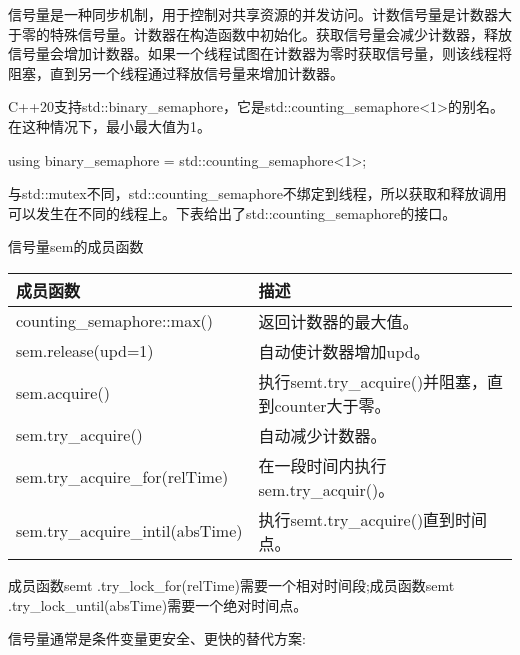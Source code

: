 信号量是一种同步机制，用于控制对共享资源的并发访问。计数信号量是计数器大于零的特殊信号量。计数器在构造函数中初始化。获取信号量会减少计数器，释放信号量会增加计数器。如果一个线程试图在计数器为零时获取信号量，则该线程将阻塞，直到另一个线程通过释放信号量来增加计数器。

C++20支持std::binary\_semaphore，它是std::counting\_semaphore<1>的别名。在这种情况下，最小最大值为1。

\begin{cpp}
using binary_semaphore = std::counting_semaphore<1>;
\end{cpp}

与std::mutex不同，std::counting\_semaphore不绑定到线程，所以获取和释放调用可以发生在不同的线程上。下表给出了std::counting\_semaphore的接口。

\begin{center}
信号量sem的成员函数
\end{center}

\begin{longtable}[c]{|l|l|}
\hline
\textbf{成员函数}         & \textbf{描述}                             \\ \hline
\endfirsthead
%
\endhead
%
counting\_semaphore::max()       & 返回计数器的最大值。         \\ \hline
sem.release(upd=1)               & 自动使计数器增加upd。             \\ \hline
sem.acquire() & 执行semt.try\_acquire()并阻塞，直到counter大于零。 \\ \hline
sem.try\_acquire()               & 自动减少计数器。               \\ \hline
sem.try\_acquire\_for(relTime)   & 在一段时间内执行sem.try\_acquir()。 \\ \hline
sem.try\_acquire\_intil(absTime) & 执行semt.try\_acquire()直到时间点。  \\ \hline
\end{longtable}

成员函数semt .try\_lock\_for(relTime)需要一个相对时间段;成员函数semt .try\_lock\_until(absTime)需要一个绝对时间点。

信号量通常是条件变量更安全、更快的替代方案:


